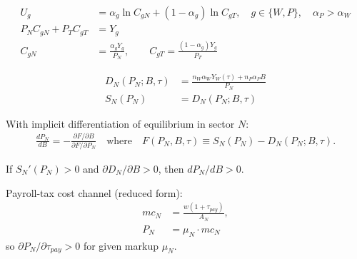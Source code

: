 ﻿%
\begin{align}
U_g &= \alpha_g \ln C_{gN} + (1-\alpha_g)\ln C_{gT}, \quad g\in\{W,P\}, \quad \alpha_P > \alpha_W \\
P_N C_{gN} + P_T C_{gT} &= Y_g \\
C_{gN} &= \frac{\alpha_g Y_g}{P_N}, \qquad C_{gT} = \frac{(1-\alpha_g)Y_g}{P_T}
\end{align}

\begin{align}
D_N(P_N;B,\tau) &= \frac{n_W\alpha_W Y_W(\tau) + n_P\alpha_P B}{P_N} \\
S_N(P_N) &= D_N(P_N;B,\tau)
\end{align}

With implicit differentiation of equilibrium in sector $N$:
\begin{align}
\frac{dP_N}{dB} = -\frac{\partial F/\partial B}{\partial F/\partial P_N}
\quad \text{where} \quad
F(P_N,B,\tau) \equiv S_N(P_N) - D_N(P_N;B,\tau).
\end{align}

If $S_N'(P_N)>0$ and $\partial D_N/\partial B > 0$, then $dP_N/dB>0$.

Payroll-tax cost channel (reduced form):
\begin{align}
mc_N &= \frac{w(1+\tau_{pay})}{A_N}, \\
P_N &= \mu_N \cdot mc_N
\end{align}
so $\partial P_N/\partial \tau_{pay} > 0$ for given markup $\mu_N$.
